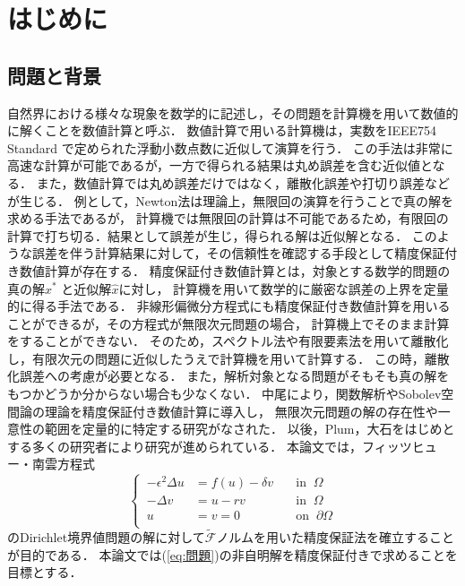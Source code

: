 \chapter{はじめに}\label{Introduction}

\section{問題と背景}
自然界における様々な現象を数学的に記述し，その問題を計算機を用いて数値的に解くことを数値計算と呼ぶ．
数値計算で用いる計算機は，実数をIEEE754 Standard で定められた浮動小数点数に近似して演算を行う．
この手法は非常に高速な計算が可能であるが，一方で得られる結果は丸め誤差を含む近似値となる．
また，数値計算では丸め誤差だけではなく，離散化誤差や打切り誤差などが生じる．
例として，Newton法は理論上，無限回の演算を行うことで真の解を求める手法であるが，
計算機では無限回の計算は不可能であるため，有限回の計算で打ち切る．結果として誤差が生じ，得られる解は近似解となる．
このような誤差を伴う計算結果に対して，その信頼性を確認する手段として精度保証付き数値計算が存在する．
精度保証付き数値計算とは，対象とする数学的問題の真の解\(x^*\) と近似解\(\hat{x}\)に対し，
計算機を用いて数学的に厳密な誤差の上界を定量的に得る手法である．
非線形偏微分方程式にも精度保証付き数値計算を用いることができるが，その方程式が無限次元問題の場合，
計算機上でそのまま計算をすることができない．
そのため，スペクトル法や有限要素法を用いて離散化し，有限次元の問題に近似したうえで計算機を用いて計算する．
この時，離散化誤差への考慮が必要となる．
また，解析対象となる問題がそもそも真の解をもつかどうか分からない場合も少なくない．
中尾\cite{artnakao}により，関数解析やSobolev空間論の理論を精度保証付き数値計算に導入し，
無限次元問題の解の存在性や一意性の範囲を定量的に特定する研究がなされた．
以後，Plum\cite{artplum}，大石\cite{artoisi}をはじめとする多くの研究者により研究が進められている．
本論文では，フィッツヒュー・南雲方程式
\begin{equation}\label{eq:問題}
  \left\{ \,
      \begin{aligned}
          -{\epsilon}^2\Delta u &= f(u)-\delta v \quad &\text{in}\;\;\Omega\\
          -\Delta v &=u-rv \quad &\text{in} \;\;\Omega\\
          u &= v=0 \quad &\text{on}\;\;\partial\Omega\\
      \end{aligned}
  \right.
\end{equation}
のDirichlet境界値問題の解に対して\(\tilde{\mathcal{F}}\)ノルムを用いた精度保証法を確立することが目的である．
本論文では(\ref{eq:問題})の非自明解を精度保証付きで求めることを目標とする．

